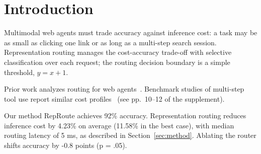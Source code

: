 \newcommand{\method}{RepRoute}

\section{Introduction}\label{sec:intro}

Multimodal web agents must trade accuracy against inference cost: a task may
be as small as clicking one link or as long as a multi-step search session.
Representation routing manages the cost-accuracy trade-off with selective
classification over each request; the routing decision boundary is a simple
threshold, $y = x + 1$.

Prior work analyzes routing for web agents~\cite{chen2024agents}.
Benchmark studies of multi-step tool use report similar cost
profiles~\cite{wang2025routing} (see pp.~10--12 of the supplement).

Our method \method{} achieves 92\% accuracy. Representation routing reduces
inference cost by 4.23\% on average (11.58\% in the best case), with median
routing latency of 5 ms, as described in Section~\ref{sec:method}. Ablating
the router shifts accuracy by -0.8 points (p = .05).
